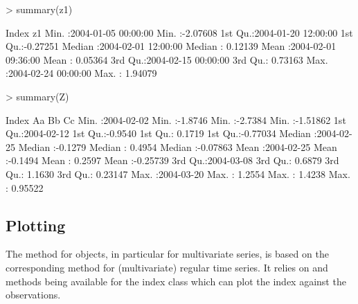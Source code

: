 \documentclass{Z}
\begin{document}
\begin{Schunk}
\begin{Sinput}
> summary(z1)
\end{Sinput}
\begin{Soutput}
     Index                           z1          
 Min.   :2004-01-05 00:00:00   Min.   :-2.07608  
 1st Qu.:2004-01-20 12:00:00   1st Qu.:-0.27251  
 Median :2004-02-01 12:00:00   Median : 0.12139  
 Mean   :2004-02-01 09:36:00   Mean   : 0.05364  
 3rd Qu.:2004-02-15 00:00:00   3rd Qu.: 0.73163  
 Max.   :2004-02-24 00:00:00   Max.   : 1.94079  
\end{Soutput}
\begin{Sinput}
> summary(Z)
\end{Sinput}
\begin{Soutput}
     Index                  Aa                Bb                Cc          
 Min.   :2004-02-02   Min.   :-1.8746   Min.   :-2.7384   Min.   :-1.51862  
 1st Qu.:2004-02-12   1st Qu.:-0.9540   1st Qu.: 0.1719   1st Qu.:-0.77034  
 Median :2004-02-25   Median :-0.1279   Median : 0.4954   Median :-0.07863  
 Mean   :2004-02-25   Mean   :-0.1494   Mean   : 0.2597   Mean   :-0.25739  
 3rd Qu.:2004-03-08   3rd Qu.: 0.6879   3rd Qu.: 1.1630   3rd Qu.: 0.23147  
 Max.   :2004-03-20   Max.   : 1.2554   Max.   : 1.4238   Max.   : 0.95522  
\end{Soutput}
\end{Schunk}

 
\subsection{Plotting}
\label{sec:plot}

The  method for  objects, in particular for
multivariate  series, is based on the corresponding
method for (multivariate) regular time series. It relies on 
and  methods being available for the index class which can
plot the index against the observations.
\end{document}
